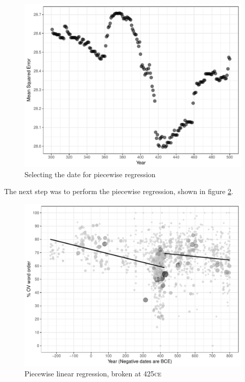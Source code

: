 \documentclass[11pt,a4paper]{scrartcl} %
\newcommand{\ce}{\textsc{ce}\ }
\begin{document}
\begin{figure}[H]
    \caption{Selecting the date for piecewise regression}
    \label{fig:sp_mse}
    \includegraphics[width=\textwidth]{sp_mse.pdf}
\end{figure}

\noindent The next step was to perform the piecewise regression, shown in figure \ref{fig:sp_piecewise_lm}.

\begin{figure}[H]
    \caption{Piecewise linear regression, broken at 425\ce}
    \label{fig:sp_piecewise_lm}
    \includegraphics[width=\textwidth]{sp_piecewise_lm.pdf}
\end{figure}
\end{document}
